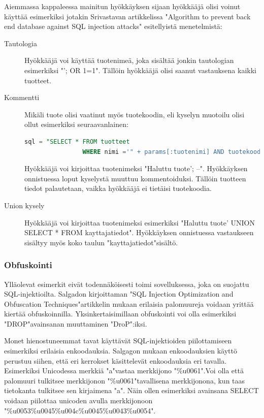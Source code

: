 \documentclass[finnish]{tktltiki2}
\theoremstyle{definition}
\theoremstyle{remark}
\begin{document}
	Aiemmassa kappaleessa mainitun hyökkäyksen sijaan hyökkääjä olisi voinut käyttää esimerkiksi jotakin Srivastavan artikkelissa "Algorithm to prevent back end database against SQL injection attacks"\cite{piggy} esitellyistä menetelmistä:  
		\begin{description}
			
		\item[Tautologia] \hfill
		
		Hyökkääjä voi käyttää tuotenimeä, joka sisältää jonkin tautologian esimerkiksi "'; OR 1=1". Tällöin hyökkääjä olisi saanut vastauksena kaikki tuotteet.
		
		\item[Kommentti] \hfill
		
		Mikäli tuote olisi vaatinut myös tuotekoodin, eli kyselyn muotoilu olisi ollut esimerkiksi seuraavanlainen:
			\begin{lstlisting}[language=sql]
				sql = "SELECT * FROM tuotteet
				WHERE nimi ='" + params[:tuotenimi] AND tuotekoodi ='"params[:tuotekoodi]"'
			\end{lstlisting}
			Hyökkääjä voi kirjoittaa tuotenimeksi "Haluttu tuote'; --". Hyökkäyksen onnistuessa loput kyselystä muuttuu kommentoiduksi. Tällöin tuotteen tiedot palautetaan, vaikka hyökkääjä ei tietäisi tuotekoodia.
			
		\item[Union kysely] \hfill
		
		Hyökkääjä voi kirjoittaa tuotenimeksi esimerkiksi "Haluttu tuote' UNION SELECT * FROM kayttajatiedot". Hyökkäyksen onnistuessa vastaukseen sisältyy myös koko taulun "kayttajatiedot"\space sisältö.
	\end{description}
	
	\subsubsection{Obfuskointi}
	
	Ylläolevat esimerkit eivät todennäköisesti toimi sovelluksessa, joka on suojattu SQL-injektioilta. Salgadon kirjoittaman "SQL Injection Optimization and Obfuscation Techniques"\cite{encoding}\space artikkelin mukaan erilaisia palomuureja voidaan yrittää kiertää obfuskoinnilla. Yksinkertaisimillaan obfuskointi voi olla esimerkiksi "DROP"\space avainsanan muuttaminen "DroP":iksi.
	
	Monet hienostuneemmat tavat käyttävät SQL-injektioiden piilottamiseen esimerkiksi erilaisia enkoodauksia. Salgagon mukaan enkoodauksien käyttö perustuu siihen, että eri kerrokset käsittelevät enkoodauksia eri tavalla. Esimerkiksi Unicodessa merkkiä "a"\space vastaa merkkijono "\%u0061".\space Voi olla että palomuuri tulkitsee merkkijonon "\%u0061"\space tavallisena merkkijonona, kun taas tietokanta tulkitsee sen kirjaimena "a". Näin ollen esimerkiksi avainsana SELECT voidaan piilottaa unicoden avulla merkkijonoon "\%u0053\%u0045\%u004c\%u0045\%u0043\%u0054".
	
\end{document}

